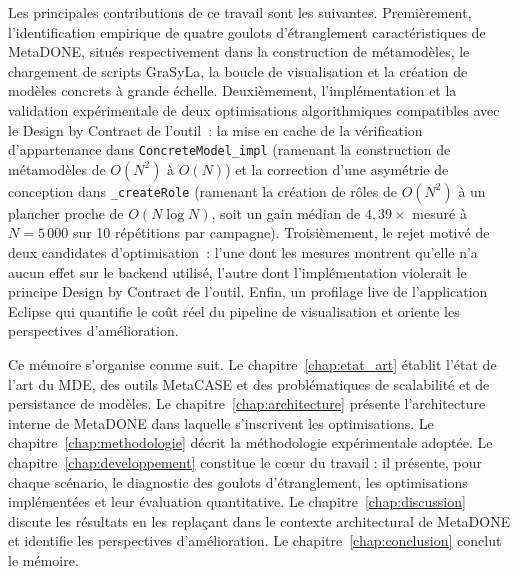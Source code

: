 Les principales contributions de ce travail sont les suivantes. Premièrement, l'identification empirique de quatre goulots d'étranglement caractéristiques de MetaDONE, situés respectivement dans la construction de métamodèles, le chargement de scripts GraSyLa, la boucle de visualisation et la création de modèles concrets à grande échelle. Deuxièmement, l'implémentation et la validation expérimentale de deux optimisations algorithmiques compatibles avec le Design by Contract de l'outil~: la mise en cache de la vérification d'appartenance dans \texttt{ConcreteModel\_impl} (ramenant la construction de métamodèles de $O(N^2)$ à $O(N)$) et la correction d'une asymétrie de conception dans \texttt{\_createRole} (ramenant la création de rôles de $O(N^2)$ à un plancher proche de $O(N \log N)$, soit un gain médian de $4{,}39\times$ mesuré à $N = 5\,000$ sur 10 répétitions par campagne). Troisièmement, le rejet motivé de deux candidates d'optimisation~: l'une dont les mesures montrent qu'elle n'a aucun effet sur le backend utilisé, l'autre dont l'implémentation violerait le principe Design by Contract de l'outil. Enfin, un profilage live de l'application Eclipse qui quantifie le coût réel du pipeline de visualisation et oriente les perspectives d'amélioration.

Ce mémoire s'organise comme suit. Le chapitre~\ref{chap:etat_art} établit l'état de l'art du MDE, des outils MetaCASE et des problématiques de scalabilité et de persistance de modèles. Le chapitre~\ref{chap:architecture} présente l'architecture interne de MetaDONE dans laquelle s'inscrivent les optimisations. Le chapitre~\ref{chap:methodologie} décrit la méthodologie expérimentale adoptée. Le chapitre~\ref{chap:developpement} constitue le cœur du travail : il présente, pour chaque scénario, le diagnostic des goulots d'étranglement, les optimisations implémentées et leur évaluation quantitative. Le chapitre~\ref{chap:discussion} discute les résultats en les replaçant dans le contexte architectural de MetaDONE et identifie les perspectives d'amélioration. Le chapitre~\ref{chap:conclusion} conclut le mémoire.